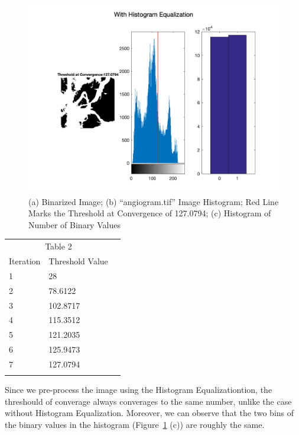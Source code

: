 \documentclass[12pt, letter]{article}
\begin{document}
\begin{figure}
    \centering
    \includegraphics[width=14cm]{with-histogram-equalization.png}
    \caption{(a) Binarized Image; (b) ``angiogram.tif'' Image Histogram; Red Line Marks the Threshold at Convergence of 127.0794; (c) Histogram of Number of Binary Values}
    \label{fig:q3-1}
\end{figure}

\begin{center}
\begin{tabular}{llr}  
\toprule
\multicolumn{2}{c}{Table 2} \\
\cmidrule(r){1-2}
Iteration   & Threshold Value \\
\midrule
1 & 28 \\
2 & 78.6122 \\
3 & 102.8717 \\
4 & 115.3512 \\
5 & 121.2035 \\
6 & 125.9473 \\
7 & 127.0794 \\

\bottomrule
\label{table:q2-2}
\end{tabular}    
\end{center}

Since we pre-process the image using the Histogram Equalizationtion, the threshould of converage always converages to the same number, unlike the case without Histogram Equalization. Moreover, we can observe that the two bins of the binary values in the histogram (Figure~\ref{fig:q3-1} (c)) are roughly the same. 
\end{document}
